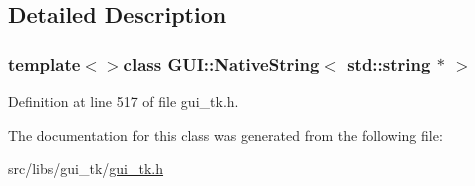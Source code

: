\subsection{Detailed Description}
\subsubsection*{template$<$$>$class G\-U\-I\-::\-Native\-String$<$ std\-::string $\ast$ $>$}



Definition at line 517 of file gui\-\_\-tk.\-h.



The documentation for this class was generated from the following file\-:\begin{DoxyCompactItemize}
\item 
src/libs/gui\-\_\-tk/\hyperlink{gui__tk_8h}{gui\-\_\-tk.\-h}\end{DoxyCompactItemize}

